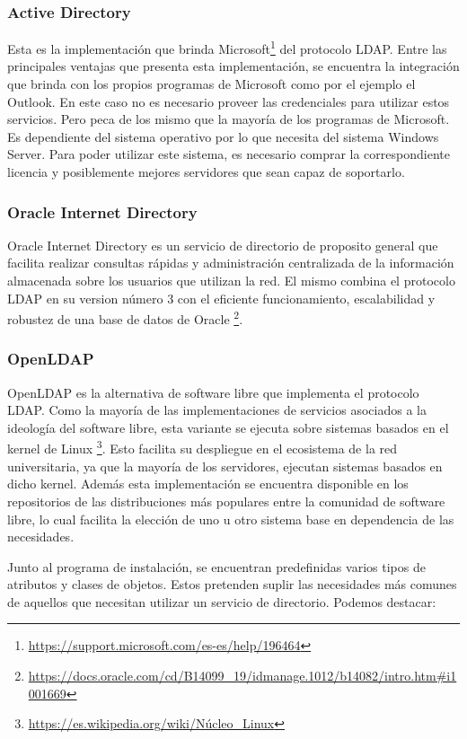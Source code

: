 \subsubsection{Active Directory}
Esta es la implementación que brinda Microsoft\footnote{\url{https://support.microsoft.com/es-es/help/196464}}
del protocolo LDAP. Entre las principales ventajas que presenta esta implementación, se encuentra
la integración que brinda con los propios programas de Microsoft como por el ejemplo el 
Outlook. En este caso no es necesario proveer las credenciales para utilizar estos servicios.
Pero peca de los mismo que la mayoría de los programas de Microsoft. Es dependiente del sistema
operativo por lo que necesita del sistema Windows Server. Para poder utilizar este sistema,
es necesario comprar la correspondiente licencia y posiblemente mejores servidores que sean capaz
de soportarlo.
\subsubsection{Oracle Internet Directory}
Oracle Internet Directory es un servicio de directorio de proposito general que facilita realizar
consultas rápidas y administración centralizada de la información almacenada sobre los usuarios
que utilizan la red. El mismo combina el protocolo LDAP en su version número 3 con el eficiente
funcionamiento, escalabilidad y robustez de una base de datos de Oracle \footnote{ 
\url{https://docs.oracle.com/cd/B14099\_19/idmanage.1012/b14082/intro.htm\#i1001669}}.

\newpage


\subsubsection{OpenLDAP}
OpenLDAP es la alternativa de software libre que implementa el protocolo LDAP. Como la mayoría de
las implementaciones de servicios asociados a la ideología del software libre, esta variante se
ejecuta sobre sistemas basados en el kernel de Linux \footnote{ \url{https://es.wikipedia.org/wiki/Núcleo_Linux}}. Esto facilita su despliegue en el ecosistema de la red
universitaria, ya que la mayoría de los servidores, ejecutan sistemas basados en dicho kernel.
Además esta implementación se encuentra disponible en los repositorios de las distribuciones más
populares entre la comunidad de software libre, lo cual facilita la elección de uno u otro 
sistema base en dependencia de las necesidades.

Junto al programa de instalación, se encuentran predefinidas varios tipos de atributos y 
clases de objetos. Estos  pretenden suplir las necesidades más comunes de aquellos que 
necesitan utilizar un servicio de directorio. Podemos destacar:

